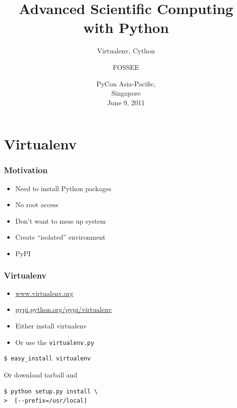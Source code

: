 \documentclass[14pt,compress]{beamer}
\title[Advanced Sci Comp.]{Advanced Scientific Computing with
Python}
\subtitle{Virtualenv, Cython }
\author[FOSSEE] {FOSSEE}
\institute[IIT Bombay] {Department of Aerospace Engineering\\IIT Bombay}
\date[] {PyCon Asia-Pacific,\\
Singapore\\
June 9, 2011
}
\newcommand{\typ}[1]{\lstinline{#1}}
\begin{document}
\begin{frame}
  \maketitle
\end{frame}


\section{Virtualenv}


\begin{frame}
  \frametitle{Motivation}
  \begin{itemize}

      \item Need to install Python packages

      \item No root access

      \item Don't want to mess up system

      \item Create ``isolated'' environment

      \item PyPI
  
  \end{itemize}

\end{frame}

\begin{frame}[fragile]
  \frametitle{Virtualenv}

  \begin{itemize}
    \item  \url{www.virtualenv.org} 

    \item \url{pypi.python.org/pypi/virtualenv}

    \item Either install virtualenv 
        
    \item Or use the \typ{virtualenv.py}

  \end{itemize}

  \begin{lstlisting}
$ easy_install virtualenv
  \end{lstlisting}
Or download tarball and
  \begin{lstlisting}
$ python setup.py install \
>  [--prefix=/usr/local]
  \end{lstlisting}

\end{frame}
\end{document}
